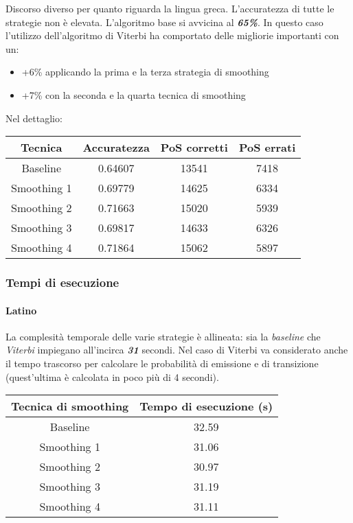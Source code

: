 \documentclass[11pt]{article}
\providecommand{\tightlist}{%
      \setlength{\itemsep}{0pt}\setlength{\parskip}{0pt}}
\begin{document}
Discorso diverso per quanto riguarda la lingua greca. L'accuratezza di
tutte le strategie non è elevata. L'algoritmo base si avvicina al
\textbf{\emph{65\%}}. In questo caso l'utilizzo dell'algoritmo di
Viterbi ha comportato delle migliorie importanti con un:

\begin{itemize}
\tightlist
\item
  +6\% applicando la prima e la terza strategia di smoothing
\item
  +7\% con la seconda e la quarta tecnica di smoothing
\end{itemize}

Nel dettaglio:

\begin{longtable}[]{@{}cccc@{}}
\toprule
Tecnica & Accuratezza & PoS corretti & PoS errati \\
\midrule
\endhead
Baseline & 0.64607 & 13541 & 7418 \\
Smoothing 1 & 0.69779 & 14625 & 6334 \\
Smoothing 2 & 0.71663 & 15020 & 5939 \\
Smoothing 3 & 0.69817 & 14633 & 6326 \\
Smoothing 4 & 0.71864 & 15062 & 5897 \\
\bottomrule
\end{longtable}

\hypertarget{tempi-di-esecuzione}{%
\subsubsection{Tempi di esecuzione}\label{tempi-di-esecuzione}}

\hypertarget{latino-1}{%
\paragraph{Latino}\label{latino-1}}

La complesità temporale delle varie strategie è allineata: sia la
\emph{baseline} che \emph{Viterbi} impiegano all'incirca
\textbf{\emph{31}} secondi. Nel caso di Viterbi va considerato anche il
tempo trascorso per calcolare le probabilità di emissione e di
transizione (quest'ultima è calcolata in poco più di 4 secondi).

\begin{longtable}[]{@{}cc@{}}
\toprule
Tecnica di smoothing & Tempo di esecuzione (s) \\
\midrule
\endhead
Baseline & 32.59 \\
Smoothing 1 & 31.06 \\
Smoothing 2 & 30.97 \\
Smoothing 3 & 31.19 \\
Smoothing 4 & 31.11 \\
\bottomrule
\end{longtable}
\end{document}
